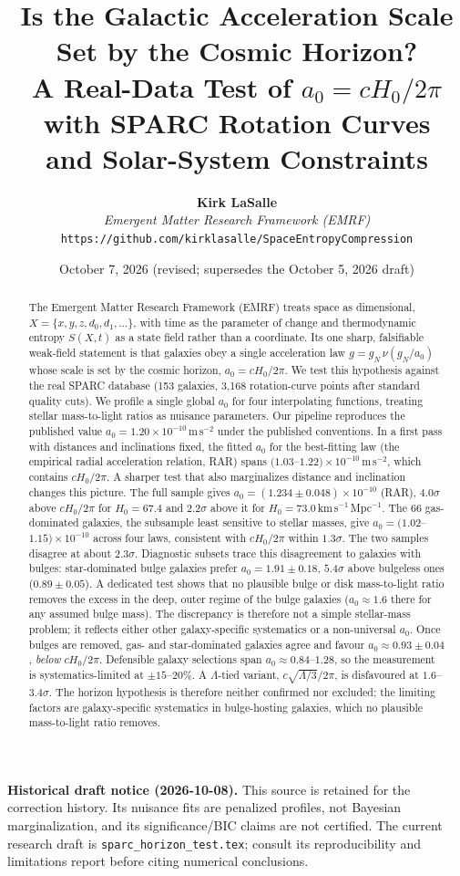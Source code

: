 \documentclass[11pt,a4paper]{article}
\title{\textbf{Is the Galactic Acceleration Scale Set by the Cosmic Horizon?\\
A Real-Data Test of $a_0 = cH_0/2\pi$ with SPARC Rotation Curves\\
and Solar-System Constraints}}
\author{
  \textbf{Kirk LaSalle} \\
  \textit{Emergent Matter Research Framework (EMRF)} \\
  \texttt{https://github.com/kirklasalle/SpaceEntropyCompression}
}
\date{October 7, 2026 (revised; supersedes the October 5, 2026 draft)}
\begin{document}
\maketitle

\noindent\textbf{Historical draft notice (2026-10-08).} This source is retained for the correction history. Its nuisance fits are penalized profiles, not Bayesian marginalization, and its significance/BIC claims are not certified. The current research draft is \texttt{sparc\_horizon\_test.tex}; consult its reproducibility and limitations report before citing numerical conclusions.

\begin{abstract}
The Emergent Matter Research Framework (EMRF) treats space as dimensional, $X=\{x,y,z,d_0,d_1,\dots\}$, with time as the parameter of change and thermodynamic entropy $S(X,t)$ as a state field rather than a coordinate. Its one sharp, falsifiable weak-field statement is that galaxies obey a single acceleration law $g = g_N\,\nu(g_N/a_0)$ whose scale is set by the cosmic horizon, $a_0 = cH_0/2\pi$. We test this hypothesis against the real SPARC database (153 galaxies, 3{,}168 rotation-curve points after standard quality cuts). We profile a single global $a_0$ for four interpolating functions, treating stellar mass-to-light ratios as nuisance parameters.
Our pipeline reproduces the published value $a_0 = 1.20\times10^{-10}$\,m\,s$^{-2}$ under the published conventions. In a first pass with distances and inclinations fixed, the fitted $a_0$ for the best-fitting law (the empirical radial acceleration relation, RAR) spans $(1.03$--$1.22)\times10^{-10}$\,m\,s$^{-2}$, which contains $cH_0/2\pi$.
A sharper test that also marginalizes distance and inclination changes this picture. The full sample gives $a_0 = (1.234 \pm 0.048)\times10^{-10}$ (RAR), $4.0\sigma$ above $cH_0/2\pi$ for $H_0 = 67.4$ and $2.2\sigma$ above it for $H_0 = 73.0$\,km\,s$^{-1}$\,Mpc$^{-1}$. The 66 gas-dominated galaxies, the subsample least sensitive to stellar masses, give $a_0 = (1.02$--$1.15)\times10^{-10}$ across four laws, consistent with $cH_0/2\pi$ within $1.3\sigma$. The two samples disagree at about $2.3\sigma$. Diagnostic subsets trace this disagreement to galaxies with bulges: star-dominated bulge galaxies prefer $a_0 = 1.91 \pm 0.18$, $5.4\sigma$ above bulgeless ones ($0.89 \pm 0.05$). A dedicated test shows that no plausible bulge or disk mass-to-light ratio removes the excess in the deep, outer regime of the bulge galaxies ($a_0 \approx 1.6$ there for any assumed bulge mass). The discrepancy is therefore not a simple stellar-mass problem; it reflects either other galaxy-specific systematics or a non-universal $a_0$. Once bulges are removed, gas- and star-dominated galaxies agree and favour $a_0 \approx 0.93 \pm 0.04$, \emph{below} $cH_0/2\pi$. Defensible galaxy selections span $a_0 \approx 0.84$--$1.28$, so the measurement is systematics-limited at $\pm15$--$20\%$. A $\Lambda$-tied variant, $c\sqrt{\Lambda/3}/2\pi$, is disfavoured at $1.6$--$3.4\sigma$. The horizon hypothesis is therefore neither confirmed nor excluded; the limiting factors are galaxy-specific systematics in bulge-hosting galaxies, which no plausible mass-to-light ratio removes.

\end{abstract}
\end{document}
